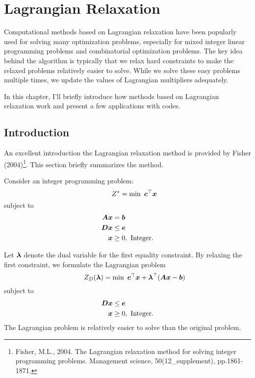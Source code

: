 \chapter{Lagrangian Relaxation}

Computational methods based on Lagrangian relaxation have been popularly used for solving many optimization problems, especially for mixed integer linear programming problems and combinatorial optimization problems. The key idea behind the algorithm is typically that we relax hard constraints to make the relaxed problems relatively easier to solve. While we solve these easy problems multiple times, we update the values of Lagrangian multipliers adequately.

In this chapter, I'll briefly introduce how methods based on Lagrangian relaxation work and present a few applications with \julia{} codes.



\section{Introduction}

An excellent introduction the Lagrangian relaxation method is provided by Fisher (2004)\footnote{Fisher, M.L., 2004. The Lagrangian relaxation method for solving integer programming problems. Management science, 50(12\_supplement), pp.1861-1871.}. This section briefly summarizes the method.

Consider an integer programming problem:
\begin{equation}
\qquad Z^* = \min \ \boldsymbol{c}^\top \boldsymbol{x}
\end{equation}
subject to
\begin{align*}
\boldsymbol{A} \boldsymbol{x} &= \boldsymbol{b} \\
\boldsymbol{D} \boldsymbol{x} &\leq \boldsymbol{e} \\
\boldsymbol{x} & \geq 0, \text{ Integer}.
\end{align*}

Let $\boldsymbol{\lambda}$ denote the dual variable for the first equality constraint. By relaxing the first constraint, we formulate the Lagrangian problem
\begin{equation}
\qquad Z_D(\boldsymbol{\lambda}) = \min \ \boldsymbol{c}^\top \boldsymbol{x} + \boldsymbol{\lambda}^\top(\boldsymbol{A}\boldsymbol{x}-\boldsymbol{b})
\end{equation}
subject to
\begin{align*}
\boldsymbol{D} \boldsymbol{x} &\leq \boldsymbol{e} \\
\boldsymbol{x} & \geq 0, \text{ Integer}.
\end{align*}
The Lagrangian problem is relatively easier to solve than the original problem.

